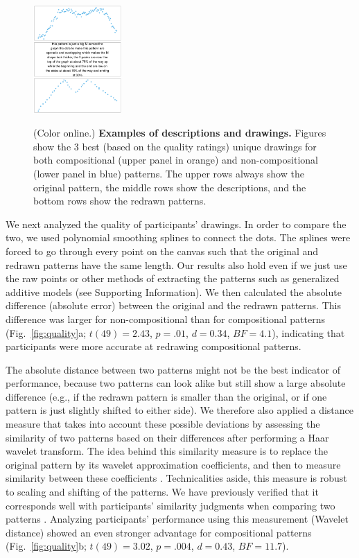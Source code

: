 \documentclass[a4paper,man, floatsintext, natbib]{apa6}
\begin{document}
\begin{figure}[h]
{\includegraphics[width=0.3\textwidth]{specexample3.pdf}
}
\caption{(Color online.) \textbf{Examples of descriptions and drawings.} Figures show the 3 best (based on the quality ratings) unique drawings for both compositional (upper panel in orange) and non-compositional (lower panel in blue) patterns. The upper rows always show the original pattern, the middle rows show the descriptions, and the bottom rows show the redrawn patterns.}
\label{fig:example1}
\end{figure}

We next analyzed the quality of participants' drawings. In order to compare the two, we used polynomial smoothing splines to connect the dots. The splines were forced to go through every point on the canvas such that the original and redrawn patterns have the same length. Our results also hold even if we just use the raw points or other methods of extracting the patterns such as generalized additive models (see Supporting Information). We then calculated the absolute difference (absolute error) between the original and the redrawn patterns. This difference was larger for non-compositional than for compositional patterns (Fig.~\ref{fig:quality}a; $t(49)=2.43$, $p=.01$, $d=0.34$, $BF=4.1$), indicating that participants were more accurate at redrawing compositional patterns.

The absolute distance between two patterns might not be the best indicator of performance, because two patterns can look alike but still show a large absolute difference (e.g., if the redrawn pattern is smaller than the original, or if one pattern is just slightly shifted to either side). We therefore also applied a distance measure that takes into account these possible deviations by assessing the similarity of two patterns based on their differences after performing a Haar wavelet transform. The idea behind this similarity measure is to replace the original pattern by its wavelet approximation coefficients, and then to measure similarity between these coefficients \citep[see Supporting Information,][]{montero2014tsclust}. Technicalities aside, this measure is robust to scaling and shifting of the patterns. We have previously verified that it corresponds well with participants' similarity judgments when comparing two patterns \citep{schulz2017compositional}. Analyzing participants' performance using this measurement (Wavelet distance) showed an even stronger advantage for compositional patterns (Fig.~\ref{fig:quality}b; $t(49)=3.02$, $p=.004$, $d=0.43$, $BF=11.7$). 
\end{document}
